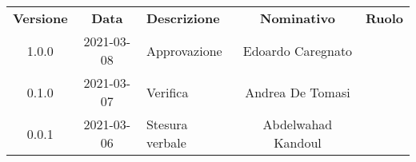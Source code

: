 {
    \renewcommand{\arraystretch}{1.5}
    \centering
    \begin{longtable}{ c c  C{4cm}  c  c }
        \rowcolor{\primaryColor}
        \textcolor{\secondaryColor}{
        \textbf{Versione}}     & \textcolor{\secondaryColor}{\textbf{Data}}       & \textcolor{\secondaryColor}
        {\textbf{Descrizione}} & \textcolor{\secondaryColor}{\textbf{Nominativo}} & \textcolor{\secondaryColor}{\textbf{Ruolo}}                          \\


        1.0.0                   & 2021-03-08                                    & Approvazione          & Edoardo Caregnato         & \responsabile{} \\
        0.1.0                   & 2021-03-07                                    & Verifica              & Andrea De Tomasi & \verificatore{} \\
        0.0.1                  & 2021-03-06                                      & Stesura verbale                             & Abdelwahad Kandoul & \redattore{}    \\
    \end{longtable}
}